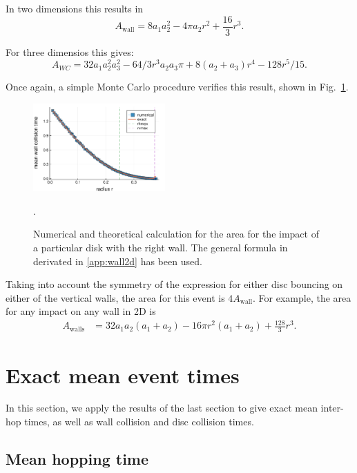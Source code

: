 \documentclass[superscriptaddress,pre,reprint,showpacs,twocolumn]{revtex4-1}
\begin{document}
In two dimensions this results in
\begin{equation}\label{areax1p}
 A_\mathrm{wall}  = 8 a_1 a_2 ^2-4  \pi a_2 r^2 +\frac{16}{3}r^3 .
\end{equation}

For three dimensios this gives:
\begin{equation}
  A_{WC}=32 a_1 a_2^2a_3^2 
  -64/3 r^3  a_2 a_3 \pi 
  +8(a_2+a_3)r^4
  -128 r^5/15.
\end{equation}

Once again, a simple Monte Carlo procedure verifies this result,
shown in Fig.~\ref{area1derecha}. 

\begin{figure}
\centering
\includegraphics[width=0.45\textwidth]{./figures/areawall01.pdf}
\caption{Numerical and theoretical calculation for the area
for the impact of a particular disk with the right wall.
The general formula in derivated in \ref{app:wall2d} has been used.}
\label{area1derecha}.
\end{figure}

Taking into account the symmetry of the expression for either disc
 bouncing on either of the vertical walls, the
area for this event is  $4A_\text{wall}$. 
For example, the area for any impact on any wall in 2D is
\begin{align}\label{areawalls}
 A_\text{walls} & = 32 a_1 a_2 (a_1+a_2)-16 \pi r^2 (a_1+a_2) +\frac{128}{3}r^3.
\end{align}


\section{Exact mean event times}

In this section, we apply the results of the last section to give
exact mean inter-hop times, as well as wall collision and disc collision times.


\subsection{Mean hopping time}
\end{document}
